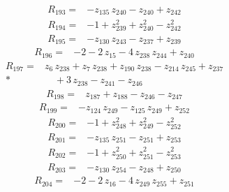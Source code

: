 \documentclass[10pt]{article}
\begin{document}
\begin{align*}
R_{193}={}& - z_{135}\,z_{240} - z_{240} + z_{242}
\end{align*}
\begin{align*}
R_{194}={}& - 1 + z_{239}^{2} + z_{240}^{2} - z_{242}^{2}
\end{align*}
\begin{align*}
R_{195}={}& - z_{130}\,z_{243} - z_{237} + z_{239}
\end{align*}
\begin{align*}
R_{196}={}& - 2 - 2\,z_{15} - 4\,z_{238}\,z_{244} + z_{240}
\end{align*}
\begin{align*}
R_{197}={}& z_{6}\,z_{238} + z_{7}\,z_{238} + z_{190}\,z_{238} - z_{214}\,z_{245} + z_{237} \\*
&\quad + 3\,z_{238} - z_{241} - z_{246}
\end{align*}
\begin{align*}
R_{198}={}& z_{187} + z_{188} - z_{246} - z_{247}
\end{align*}
\begin{align*}
R_{199}={}& - z_{124}\,z_{249} - z_{125}\,z_{249} + z_{252}
\end{align*}
\begin{align*}
R_{200}={}& - 1 + z_{248}^{2} + z_{249}^{2} - z_{252}^{2}
\end{align*}
\begin{align*}
R_{201}={}& - z_{135}\,z_{251} - z_{251} + z_{253}
\end{align*}
\begin{align*}
R_{202}={}& - 1 + z_{250}^{2} + z_{251}^{2} - z_{253}^{2}
\end{align*}
\begin{align*}
R_{203}={}& - z_{130}\,z_{254} - z_{248} + z_{250}
\end{align*}
\begin{align*}
R_{204}={}& - 2 - 2\,z_{16} - 4\,z_{249}\,z_{255} + z_{251}
\end{align*}
\end{document}
